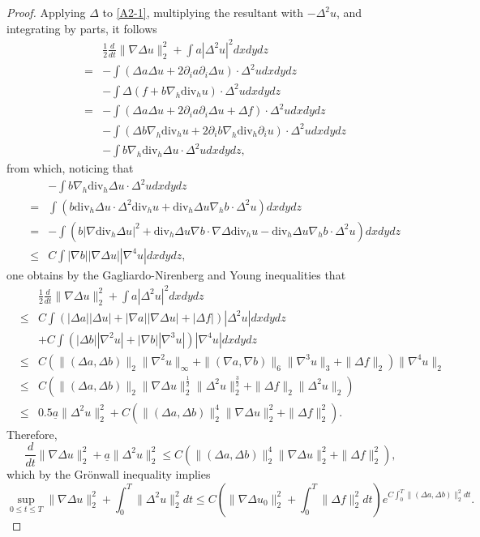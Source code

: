 \documentclass[12pt,reqno]{amsart}
\numberwithin{equation}{section}
\begin{document}
\begin{proof}
  Applying $\Delta$ to \eqref{A2-1}, multiplying the resultant with $-\Delta^2u$, and integrating by parts, it follows
  \begin{eqnarray*}
    &&\frac12\frac{d}{dt}\|\nabla\Delta u\|_2^2+\int a|\Delta^2u|^2dxdydz\\
    &=&-\int(\Delta a\Delta u+2\partial_ia\partial_i\Delta u)\cdot\Delta^2udxdydz\\
    &&-\int\Delta(f+b\nabla_h\text{div}_hu)\cdot\Delta^2udxdydz\\
    &=&-\int(\Delta a\Delta u+2\partial_ia\partial_i\Delta u+\Delta f)\cdot\Delta^2udxdydz\\
    &&-\int(\Delta b\nabla_h\text{div}_hu+2\partial_ib\nabla_h\text{div}_h\partial_iu)\cdot\Delta^2udxdydz\\
    &&-\int b\nabla_h\text{div}_h\Delta u\cdot\Delta^2udxdydz,
  \end{eqnarray*}
  from which, noticing that
  \begin{eqnarray*}
    &&-\int b\nabla_h\text{div}_h\Delta u\cdot\Delta^2udxdydz\\
    &=&\int(b\text{div}_h\Delta u\cdot\Delta^2\text{div}_hu+\text{div}_h\Delta u\nabla_hb\cdot\Delta^2u)dxdydz\\
    &=&-\int(b|\nabla\text{div}_h\Delta u|^2+\text{div}_h\Delta u\nabla b\cdot\nabla\Delta\text{div}_hu-\text{div}_h\Delta u\nabla_hb\cdot\Delta^2u)
    dxdydz\\
    &\leq&C\int|\nabla b||\nabla\Delta u||\nabla^4u|dxdydz,
  \end{eqnarray*}
  one obtains by the Gagliardo-Nirenberg and Young inequalities that
  \begin{eqnarray*}
    &&\frac12\frac{d}{dt}\|\nabla\Delta u\|_2^2+\int a|\Delta^2u|^2dxdydz\\
    &\leq&C\int(|\Delta a||\Delta u|+|\nabla a||\nabla\Delta u|+|\Delta f|)|\Delta^2u|dxdydz\\
    &&+C\int(|\Delta b||\nabla^2u|+|\nabla b||\nabla^3u|)|\nabla^4u|dxdydz\\
    &\leq&C(\|(\Delta a, \Delta b)\|_2\|\nabla^2u\|_\infty+\|(\nabla a,\nabla b)\|_6\|\nabla^3u\|_3+\|\Delta f\|_2)\|\nabla^4u\|_2\\
    &\leq&C\left(\|(\Delta a,\Delta b)\|_2\|\nabla\Delta u\|_2^\frac12\|\Delta^2u\|_2^\frac32+\|\Delta f\|_2\|\Delta^2u\|_2\right)\\
    &\leq&0.5\underline a\|\Delta^2u\|_2^2+C\left(\|(\Delta a,\Delta b)\|_2^4\|\nabla\Delta u\|_2^2+\|\Delta f\|_2^2\right).
  \end{eqnarray*}
  Therefore,
  \begin{equation*}
    \frac{d}{dt}\|\nabla\Delta u\|_2^2+\underline a\|\Delta^2u\|_2^2\leq C\left(\|(\Delta a,\Delta b)\|_2^4\|\nabla\Delta u\|_2^2+\|\Delta f\|_2^2\right),
  \end{equation*}
  which by the Gr\"onwall inequality implies
  \begin{equation}
  \label{EST3U}
    \sup_{0\leq t\leq T}\|\nabla\Delta u\|_2^2+\int_0^T\|\Delta^2u\|_2^2dt
    \leq C\left(\|\nabla\Delta u_0\|_2^2+\int_0^T\|\Delta f\|_2^2dt\right)e^{C\int_0^T\|(\Delta a,\Delta b)\|_2^2dt}.
  \end{equation}


\end{proof}
\end{document}

